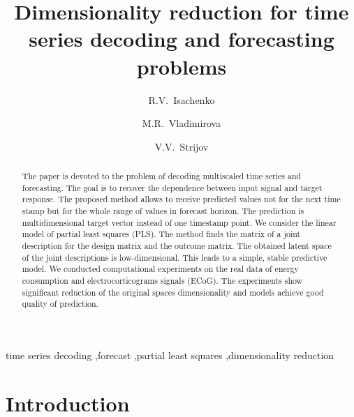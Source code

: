 \documentclass[preprint,12pt]{elsarticle}
\begin{document}
	\begin{frontmatter}
	\title{Dimensionality reduction for time series decoding and forecasting problems}
	\author[mipt,sk]{R.V.~Isachenko}
	\author[mipt]{M.R.~Vladimirova}
	\author[ccas]{V.V.~Strijov}
	
	\address[mipt]{
		Moscow Institute of Physics and Technology, 9 Institutskiy Per., Dolgoprudny, Moscow Region 141700, Russian Federation}
	\address[sk]{Skolkovo Institute of Science and Technology, 3 Nobel Str., Moscow 143026, Russian Federation}
	\address[ccas]{A. A. Dorodnicyn Computing Centre, Federal Research Center “Computer Science and Control” of the Russian Academy of Sciences, 40 Vavilov Str., Moscow 119333, Russian Federation}
	
	\begin{abstract} 
	The paper is devoted to the problem of decoding multiscaled time series and forecasting.
	The goal is to recover the dependence between input signal and target response.
	The proposed method allows to receive predicted values not for the next time stamp but for the whole range of values in forecast horizon.
	The prediction is multidimensional target vector instead of one timestamp point. 
	We consider the linear model of partial least squares (PLS).
	The method finds the matrix of a joint description for the design matrix and the outcome matrix.
	The obtained latent space of the joint descriptions is low-dimensional.
	This leads to a simple, stable predictive model.
	We conducted computational experiments on the real data of energy consumption and electrocorticograms signals (ECoG). 
	The experiments show significant reduction of the original spaces dimensionality and models achieve good quality of prediction.
	\end{abstract}
	\begin{keyword}
	time series decoding \sep forecast \sep partial least squares \sep dimensionality reduction
\end{keyword}
	\end{frontmatter}
\section{Introduction}
\end{document}
